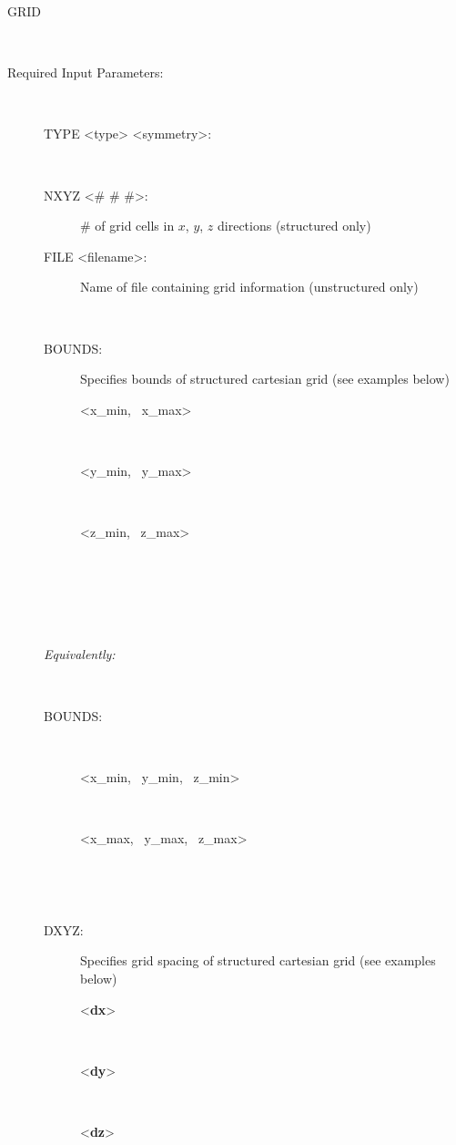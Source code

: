 \documentclass[12pt]{article}
\begin{document}
\begin{description}
\item[GRID]~
\item[Required Input Parameters:]~

\begin{description}
\item[TYPE <type> <symmetry>:] ~


\item[NXYZ <\# \# \#>:] \# of grid cells in $x$, $y$, $z$ directions (structured only)

\item[FILE <filename>:] Name of file containing grid information (unstructured only)

~\\

\item[BOUNDS:] Specifies bounds of structured cartesian grid (see examples below)
\begin{description}
\item[<x\_min, \ x\_max>]~
\item[<y\_min, \ y\_max>]~
\item[<z\_min, \ z\_max>]~
\end{description}
\item[\keyend] ~

~\\

\noindent
\item[\em Equivalently:] ~
\item[BOUNDS:] ~
\begin{description}
\item[<x\_min, \ y\_min, \ z\_min>]~
\item[<x\_max, \ y\_max, \ z\_max>]~
\end{description}
\item[\keyend] ~

\item[DXYZ:] Specifies grid spacing of structured cartesian grid (see examples below)
\begin{description}
\item[<{\bf dx}>] ~
\item[<{\bf dy}>] ~
\item[<{\bf dz}>] ~
\end{description}
\item[\keyend] ~
\end{description}


\end{description}
\end{document}
